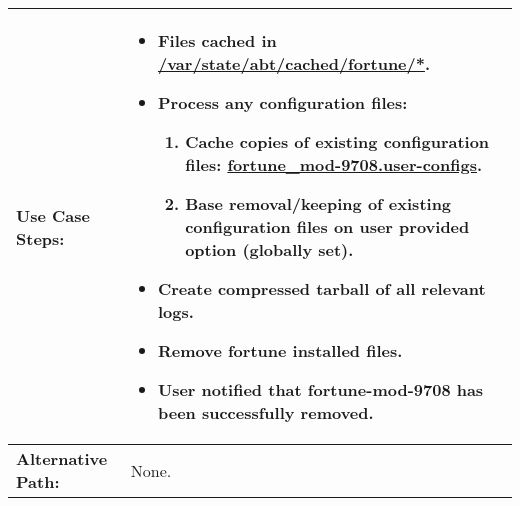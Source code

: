 \begin{tabularx}{\linewidth}{|l|X|}
\hline
\textbf{Use Case Steps:} & 
\begin{minipage}{\linewidth} 
  \vspace{0.05em}
  \begin{itemize}
    \item Files cached in \url{/var/state/abt/cached/fortune/*}.
    \item Process any configuration files:
    \begin{enumerate}
      \item Cache copies of existing configuration files: \url{fortune_mod-9708.user-configs}.
      \item Base removal/keeping of existing configuration files on user provided option (globally set).
    \end{enumerate}
    \item Create compressed tarball of all relevant logs.
    \item Remove fortune installed files.
    \item User notified that fortune-mod-9708 has been successfully removed.
  \end{itemize}
  \vspace{0.05em}
\end{minipage}
\\
\hline 
\textbf{Alternative Path:} & None. \\
\hline
\end{tabularx}

\newpage


